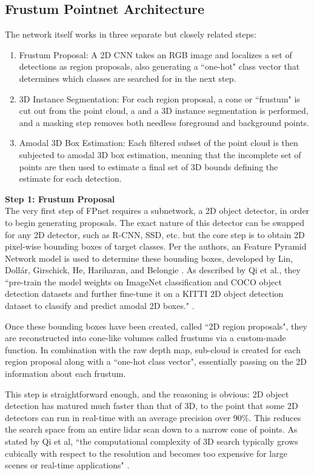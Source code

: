 \subsection{Frustum Pointnet Architecture}
The network itself works in three separate but closely related steps: 
\begin{enumerate}
    \item Frustum Proposal: A 2D CNN takes an RGB image and localizes a set of detections as region proposals, also generating a ``one-hot" class vector that determines which classes are searched for in the next step.
    \item 3D Instance Segmentation: For each region proposal, a cone or ``frustum" is cut out from the point cloud, a and a 3D instance segmentation is performed, and a masking step removes both needless foreground and background points.
    \item Amodal 3D Box Estimation: Each filtered subset of the point cloud is then subjected to amodal 3D box estimation, meaning that the incomplete set of points are then used to estimate a final set of 3D bounds defining the estimate for each detection.
\end{enumerate}

\textbf{{\large Step 1: Frustum Proposal}} \\
The very first step of FPnet requires a subnetwork, a 2D object detector, in order to begin generating proposals. The exact nature of this detector can be swapped for any 2D detector, such as R-CNN, SSD, etc. but the core step is to obtain 2D pixel-wise bounding boxes of target classes. Per the authors, an Feature Pyramid Network model is used to determine these bounding boxes, developed by Lin, Dollár, Girschick, He, Hariharan, and Belongie \cite{lin_feature_2017}. As described by Qi et al., they ``pre-train the model weights on ImageNet classification and COCO object detection datasets and further fine-tune it on a KITTI 2D object detection dataset to classify and predict amodal 2D boxes." \cite{qi_frustum_2017}.

Once these bounding boxes have been created, called ``2D region proposals", they are reconstructed into cone-like volumes called frustums via a custom-made function. In combination with the raw depth map, sub-cloud is created for each region proposal along with a ``one-hot class vector", essentially passing on the 2D information about each frustum. 

This step is straightforward enough, and the reasoning is obvious: 2D object detection has matured much faster than that of 3D, to the point that some 2D detectors can run in real-time with an average precision over 90\%. This reduces the search space from an entire lidar scan down to a narrow cone of points. As stated by Qi et al, ``the computational complexity of 3D search typically grows cubically with respect to the resolution and becomes too expensive for large scenes or real-time applications" \cite{qi_frustum_2017}.


